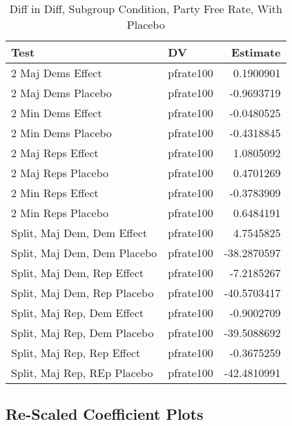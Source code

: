 \documentclass[12pt]{article}
\begin{document}
\begin{table}[ht]
	\centering
	\caption{Diff in Diff, Subgroup Condition, Party Free Rate, With Placebo}
	\begin{tabular}{llr}
		\hline
		Test & DV & Estimate \\ 
		\hline
		2 Maj Dems Effect & pfrate100 & 0.1900901 \\ 
		2 Maj Dems Placebo & pfrate100 & -0.9693719 \\ 
		\hline
		2 Min Dems Effect & pfrate100 & -0.0480525 \\ 
		2 Min Dems Placebo & pfrate100 & -0.4318845 \\ 
		\hline
		2 Maj Reps Effect & pfrate100 & 1.0805092 \\ 
		2 Maj Reps Placebo & pfrate100 & 0.4701269 \\ 
		\hline
		2 Min Reps Effect & pfrate100 & -0.3783909 \\ 
		2 Min Reps Placebo & pfrate100 & 0.6484191 \\ 
		\hline
		Split, Maj Dem, Dem Effect & pfrate100 & 4.7545825 \\ 
		Split, Maj Dem, Dem Placebo & pfrate100 & -38.2870597 \\ 
		\hline
		Split, Maj Dem, Rep Effect & pfrate100 & -7.2185267 \\ 
		Split, Maj Dem, Rep Placebo & pfrate100 & -40.5703417 \\ 
		\hline
		Split, Maj Rep, Dem Effect & pfrate100 & -0.9002709 \\ 
		Split, Maj Rep, Dem Placebo & pfrate100 & -39.5088692 \\ 
		\hline
		Split, Maj Rep, Rep Effect & pfrate100 & -0.3675259 \\ 
		Split, Maj Rep, REp Placebo & pfrate100 & -42.4810991 \\ 
		\hline
	\end{tabular}
\end{table}

\subsection{Re-Scaled Coefficient Plots}
\end{document}
